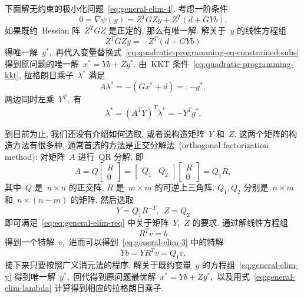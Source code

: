 \documentclass{SBCbookchapter}
\numberwithin{equation}{section}
\begin{document}
下面解无约束的极小化问题~\eqref{eq:general-elim-4}. 考虑一阶条件
\begin{equation}
\label{eq:general-elim-5}
0 = \nabla \psi ({y}) = Z^T G Z {y} + Z^T \left( {d} + G Y {b} \right).
\end{equation}
如果既约~Hessian 阵~$Z^T G Z$ 是正定的, 那么有唯一解. 解关于~${y}$ 的线性方程组
\begin{equation}
\label{eq:general-elim-y}
Z^T G Z {y} = - Z^T \left( {d} + G Y {b} \right)
\end{equation}
得唯一解~${y}^*,$ 再代入变量替换式~\eqref{eq:quadratic-programming-eq-constrained-subs} 得到原问题的唯一解~${x}^* = Y {b} + Z {y}^*.$ 由~KKT 条件~\eqref{eq:quadratic-programming-kkt}, 拉格朗日乘子~${\lambda}^*$ 满足
\begin{equation}
\label{eq:general-elim-lagrange}
A {\lambda}^* = -\left( G {x}^* + {d} \right) =: - {g}^*,
\end{equation}
两边同时左乘~$Y^T,$ 有
\begin{equation}
\label{eq:general-elim-lambda}
{\lambda}^* = \left( A^T Y \right)^T {\lambda}^* = -Y^T {g}^*.
\end{equation}

到目前为止, 我们还没有介绍如何选取, 或者说构造矩阵~$Y$ 和~$Z.$ 这两个矩阵的构造方法有很多种, 通常首选的方法是正交分解法~(orthogonal factorization method): 对矩阵~$A$ 进行~QR 分解, 即
\begin{equation}
\label{eq:quadratic-programming-qr-decomp-1}
A = Q \begin{bmatrix} R \\ 0 \end{bmatrix} = \begin{bmatrix} Q_1 & Q_2 \end{bmatrix} \begin{bmatrix} R \\ 0 \end{bmatrix} = Q_1 R,
\end{equation}
其中~$Q$ 是~$n \times n$ 的正交阵, $R$ 是~$m \times m$ 的可逆上三角阵. $Q_1, Q_2$ 分别是~$n \times m$ 和~$n \times (n - m)$ 的矩阵. 然后选取
\begin{equation}
\label{eq:quadratic-programming-qr-decomp-2}
Y = Q_1 R^{-T}, ~~ Z = Q_2
\end{equation}
即可满足~\eqref{eq:eq:general-elim-req} 中关于矩阵~$Y,$ $Z$ 的要求. 通过解线性方程组
\begin{equation*}
R^T {v} = {b}
\end{equation*}
得到一个特解~${v},$ 进而可以得到~\eqref{eq:general-elim-3} 中的特解
\begin{equation*}
Y {b} = Y R^T {v} = Q_1 {v}.
\end{equation*}
接下来只要按照广义消元法的程序, 解关于既约变量~${y}$ 的方程组~\eqref{eq:general-elim-y} 得到唯一解~${y}^*,$ 回代得到原问题最优解~${x}^* = Y {b} + Z {y}^*,$
以及用式~\eqref{eq:general-elim-lambda} 计算得到相应的拉格朗日乘子.
\end{document}
